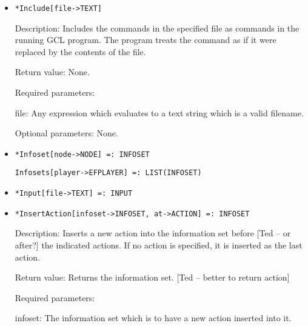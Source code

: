 \begin{itemize}
\item
\protect \large \begin{verbatim}
*Include[file->TEXT]
\end{verbatim}\normalsize

\bd
\item
[Description:] Includes the commands in the specified file as commands
in the running GCL program.  The program treats the command as if it
were replaced by the contents of the file.
\item
[Return value:] None.
\item
[Required parameters:]\hfil\null
	
\bd
\item
[file:] Any expression which evaluates to a text string which is a
valid filename.
\ed

\item
[Optional parameters:] None.\hfil\null
\ed

\item
\protect \large \begin{verbatim}
*Infoset[node->NODE] =: INFOSET
\end{verbatim}\normalsize

\protect \large \begin{verbatim}
Infosets[player->EFPLAYER] =: LIST(INFOSET)
\end{verbatim}\normalsize

\item
\protect \large \begin{verbatim}
*Input[file->TEXT] =: INPUT
\end{verbatim}\normalsize

\item
\protect \large \begin{verbatim}
*InsertAction[infoset->INFOSET, at->ACTION] =: INFOSET 
\end{verbatim}\normalsize

\bd
\item
[Description:] Inserts a new action into the information set before [Ted
-- or after?] the indicated actions.  If no action is specified, it is
inserted as the last action.
\item
[Return value:] Returns the information set. [Ted -- better to return action]
\item
[Required parameters:]\hfil\null

\bd
\item
[infoset:] The information set which is to have a new
action inserted into it.
\ed


\end{itemize}
